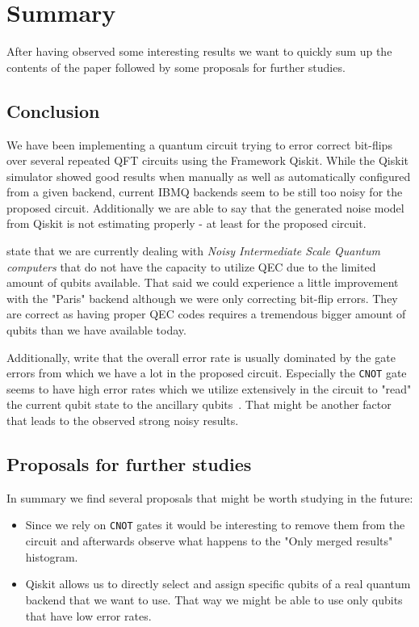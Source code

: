 \section{Summary}
\label{sec:summary}

After having observed some interesting results we want to quickly sum up the contents of the paper followed by some proposals for further studies.

\subsection{Conclusion}
\label{subsec:conclusion}

We have been implementing a quantum circuit trying to error correct bit-flips over several repeated QFT circuits using the Framework Qiskit.
While the Qiskit simulator showed good results when manually as well as automatically configured from a given backend, current IBMQ backends seem to be still too noisy for the proposed circuit.
Additionally we are able to say that the generated noise model from Qiskit is not estimating properly - at least for the proposed circuit.

 state that we are currently dealing with \emph{Noisy Intermediate Scale Quantum computers} that do not have the capacity to utilize QEC due to the limited amount of qubits available.
That said we could experience a little improvement with the "Paris" backend although we were only correcting bit-flip errors.
They are correct as having proper QEC codes requires a tremendous bigger amount of qubits than we have available today.

Additionally,  write that the overall error rate is usually dominated by the gate errors from which we have a lot in the proposed circuit.
Especially the \texttt{CNOT} gate seems to have high error rates which we utilize extensively in the circuit to "read" the current qubit state to the ancillary qubits~\cite[p. 3]{tannu2018case}.
That might be another factor that leads to the observed strong noisy results.

\subsection{Proposals for further studies}
\label{subsec:proposals-for-further-studies}

In summary we find several proposals that might be worth studying in the future:

\begin{itemize}
    \item Since we rely on \texttt{CNOT} gates it would be interesting to remove them from the circuit and afterwards observe what happens to the "Only merged results" histogram.
    \item Qiskit allows us to directly select and assign specific qubits of a real quantum backend that we want to use.
    That way we might be able to use only qubits that have low error rates.
\end{itemize}
